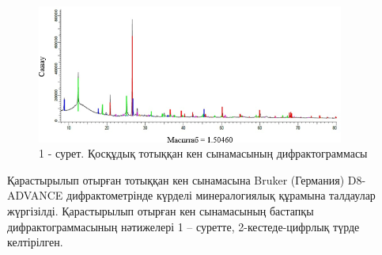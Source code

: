 \begin{figure}[H]
	\centering
	\includegraphics[width=0.9\textwidth]{media/gorn/image6}
	\caption*{1 - сурет. Қосқұдық тотыққан кен сынамасының дифрактограммасы}
\end{figure}

\begin{multicols}{2}
Қарастырылып отырған тотыққан кен сынамасына Bruker (Германия)
D8-ADVANCE дифрактометрінде күрделі минералогиялық құрамына талдаулар
жүргізілді. Қарастырылып отырған кен сынамасының бастапқы
дифрактограммасының нәтижелері 1 -- суретте, 2-кестеде-цифрлық түрде
келтірілген.
\end{multicols}

